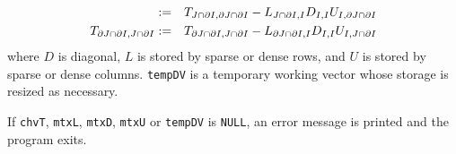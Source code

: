 \begin{enumerate}
\begin{eqnarray*}
& := & T_{J \cap {\partial}{I},{\partial}{J} \cap {\partial}{I}} 
- L_{J \cap {\partial}{I},I} D_{I,I} U_{I, {\partial}{J} \cap {\partial}{I}} \\
T_{{\partial}{J} \cap {\partial}{I},J \cap {\partial}{I}} 
& := & T_{{\partial}{J} \cap {\partial}{I},J \cap {\partial}{I}} 
- L_{{\partial}{J} \cap {\partial}{I},I} D_{I,I} U_{I, J \cap {\partial}{I}} 
\end{eqnarray*}
where $D$ is diagonal,
$L$ is stored by sparse or dense rows, and
$U$ is stored by sparse or dense columns.
{\tt tempDV} is a temporary working vector whose storage 
is resized as necessary.
\par {}
If {\tt chvT}, {\tt mtxL}, {\tt mtxD}, {\tt mtxU} or {\tt tempDV}
is {\tt NULL},
an error message is printed and the program exits.
\end{enumerate}
\par
